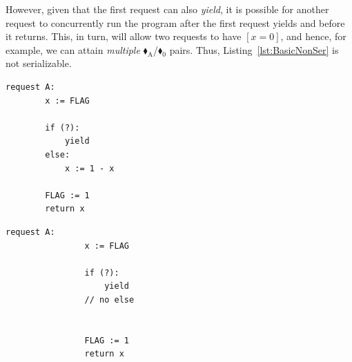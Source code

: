 %
%
%
%
%
%
%
%
However, given that the first request can also \textit{yield}, it is possible for another request to concurrently run the program after the first request yields and before it returns. This, in turn, will allow two requests to have $[x=0]$, and hence, for example, we can attain \textit{multiple} {\color{ForestGreen}$\blacklozenge_\text{A}$}/{\color{red}$\blacklozenge_0$} pairs. Thus, Listing~\ref{lst:BasicNonSer} is not serializable.
%
%
%
%
%




\noindent
\begin{minipage}[t]{0.45\textwidth}
	\begin{lstlisting}[caption={Serializable},
		label={lst:BasicSer},numbers=none]
	request A: 
		x := FLAG
		
		if (?):
			yield
		else:
			x := 1 - x
		
		FLAG := 1
		return x
	\end{lstlisting}
\end{minipage}
\hfill
\begin{minipage}[t]{0.45\textwidth}
	\begin{lstlisting}[caption={Not serializable},
	label={lst:BasicNonSer},numbers=none]
			request A: 
			    x := FLAG 
			
			    if (?): 
			        yield
			    // no else
			
			
			    FLAG := 1 
			    return x
		\end{lstlisting}
\end{minipage}%

